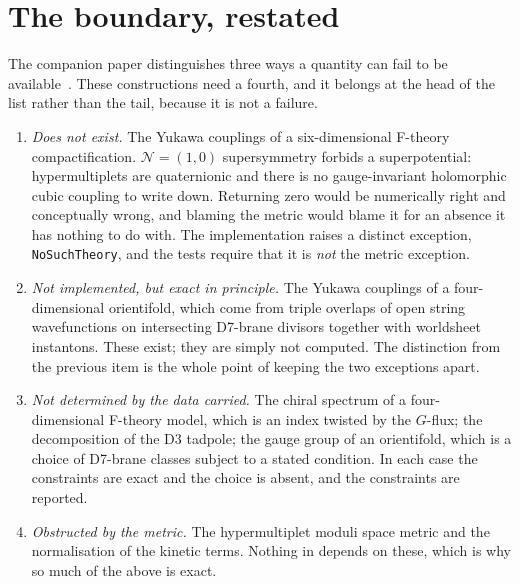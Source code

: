 \documentclass[11pt,a4paper]{article}
\theoremstyle{definition}
\begin{document}

\section{The boundary, restated}
\label{sec:boundary}

The companion paper distinguishes three ways a quantity can fail to be
available~\cite{SuppMath}. These constructions need a fourth, and it belongs
at the head of the list rather than the tail, because it is not a failure.

\begin{enumerate}[leftmargin=2em]
\item \emph{Does not exist.} The Yukawa couplings of a six-dimensional
F-theory compactification. $\mathcal{N}=(1,0)$ supersymmetry forbids a
superpotential: hypermultiplets are quaternionic and there is no
gauge-invariant holomorphic cubic coupling to write down. Returning zero would
be numerically right and conceptually wrong, and blaming the metric would
blame it for an absence it has nothing to do with. The implementation raises a
distinct exception, \texttt{NoSuchTheory}, and the tests require that it is
\emph{not} the metric exception.

\item \emph{Not implemented, but exact in principle.} The Yukawa couplings of
a four-dimensional orientifold, which come from triple overlaps of open string
wavefunctions on intersecting D7-brane divisors together with worldsheet
instantons. These exist; they are simply not computed. The distinction from
the previous item is the whole point of keeping the two exceptions apart.

\item \emph{Not determined by the data carried.} The chiral spectrum of a
four-dimensional F-theory model, which is an index twisted by the $G$-flux;
the decomposition of the D3 tadpole; the gauge group of an orientifold, which
is a choice of D7-brane classes subject to a stated condition. In each case
the constraints are exact and the choice is absent, and the constraints are
reported.

\item \emph{Obstructed by the metric.} The hypermultiplet moduli space metric
and the normalisation of the kinetic terms. Nothing in
 depends on these, which is why so much of the
above is exact.
\end{enumerate}
\end{document}
